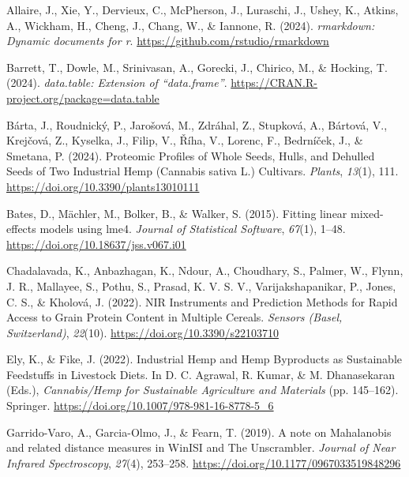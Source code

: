 \documentclass[
]{agujournal2019}
\newlength{\cslhangindent}
\newenvironment{CSLReferences}[2] %
 {\begin{list}{}{%
  \setlength{\itemindent}{0pt}
  \setlength{\leftmargin}{0pt}
  \setlength{\parsep}{0pt}
  \ifodd #1
   \setlength{\leftmargin}{\cslhangindent}
   \setlength{\itemindent}{-1\cslhangindent}
  \fi
  \setlength{\itemsep}{#2\baselineskip}}}
 {\end{list}}
\begin{document}
\label{refs}
\begin{CSLReferences}{1}{0}
\vspace{1em}

Allaire, J., Xie, Y., Dervieux, C., McPherson, J., Luraschi, J., Ushey,
K., Atkins, A., Wickham, H., Cheng, J., Chang, W., \& Iannone, R.
(2024). \emph{{rmarkdown}: Dynamic documents for r}.
\url{https://github.com/rstudio/rmarkdown}

Barrett, T., Dowle, M., Srinivasan, A., Gorecki, J., Chirico, M., \&
Hocking, T. (2024). \emph{{data.table}: Extension of
{``{data.frame}''}}. \url{https://CRAN.R-project.org/package=data.table}

Bárta, J., Roudnický, P., Jarošová, M., Zdráhal, Z., Stupková, A.,
Bártová, V., Krejčová, Z., Kyselka, J., Filip, V., Říha, V., Lorenc, F.,
Bedrníček, J., \& Smetana, P. (2024). Proteomic {Profiles} of {Whole}
{Seeds}, {Hulls}, and {Dehulled} {Seeds} of {Two} {Industrial} {Hemp}
({Cannabis} sativa {L}.) {Cultivars}. \emph{Plants}, \emph{13}(1), 111.
\url{https://doi.org/10.3390/plants13010111}

Bates, D., Mächler, M., Bolker, B., \& Walker, S. (2015). Fitting linear
mixed-effects models using {lme4}. \emph{Journal of Statistical
Software}, \emph{67}(1), 1--48.
\url{https://doi.org/10.18637/jss.v067.i01}

Chadalavada, K., Anbazhagan, K., Ndour, A., Choudhary, S., Palmer, W.,
Flynn, J. R., Mallayee, S., Pothu, S., Prasad, K. V. S. V.,
Varijakshapanikar, P., Jones, C. S., \& Kholová, J. (2022). {NIR}
{Instruments} and {Prediction} {Methods} for {Rapid} {Access} to {Grain}
{Protein} {Content} in {Multiple} {Cereals}. \emph{Sensors (Basel,
Switzerland)}, \emph{22}(10). \url{https://doi.org/10.3390/s22103710}

Ely, K., \& Fike, J. (2022). Industrial {Hemp} and {Hemp} {Byproducts}
as {Sustainable} {Feedstuffs} in {Livestock} {Diets}. In D. C. Agrawal,
R. Kumar, \& M. Dhanasekaran (Eds.), \emph{Cannabis/{Hemp} for
{Sustainable} {Agriculture} and {Materials}} (pp. 145--162). Springer.
\url{https://doi.org/10.1007/978-981-16-8778-5_6}

Garrido-Varo, A., Garcia-Olmo, J., \& Fearn, T. (2019). A note on
{Mahalanobis} and related distance measures in {WinISI} and {The}
{Unscrambler}. \emph{Journal of Near Infrared Spectroscopy},
\emph{27}(4), 253--258. \url{https://doi.org/10.1177/0967033519848296}


\end{CSLReferences}
\end{document}
